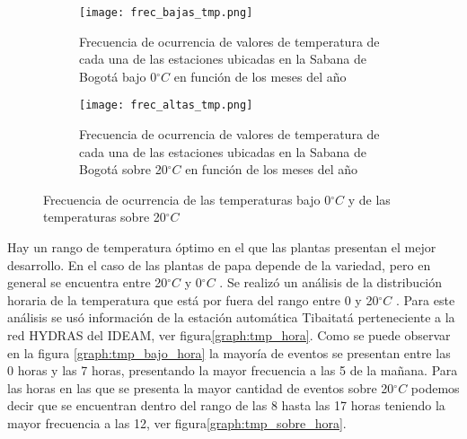 \documentclass[11pt]{article}
\def\celc{$^{\circ}C$ }%
\begin{document}
\begin{figure}[H]
	\begin{subfigure}[b]{\linewidth}
	\begin{center}
	\texttt{[image: frec\_bajas\_tmp.png]}
		
		\caption{Frecuencia de ocurrencia de valores de temperatura de cada una de las estaciones ubicadas en la Sabana de Bogotá bajo 0\celc en función de los meses del año}
		\label{graph:tmp_bajo_meses}
		
	\end{center}
	\end{subfigure}
	
	\begin{subfigure}[b]{\linewidth}
	\begin{center}
	\texttt{[image: frec\_altas\_tmp.png]}
		
		\caption{Frecuencia de ocurrencia de valores de temperatura de cada una de las estaciones ubicadas en la Sabana de Bogotá sobre 20\celc en función de los meses del año}		
		\label{graph:tmp_sobre_meses}
		
	\end{center}
	\end{subfigure}
	
	
	\caption{Frecuencia de ocurrencia de las temperaturas bajo 0\celc y de las temperaturas sobre 20\celc}		
	\label{graph:tmp_meses}

\end{figure}

Hay un rango de temperatura óptimo en el que las plantas presentan el mejor desarrollo. En el caso de las plantas de papa depende de la variedad, pero en general se encuentra entre 20\celc y 0\celc \citep{Hijmans2003}. Se realizó un análisis de la distribución horaria de la temperatura que está por fuera del rango entre 0 y 20\celc. Para este análisis se usó información de la estación automática Tibaitatá perteneciente a la red HYDRAS del IDEAM, ver figura\ref{graph:tmp_hora}. Como se puede observar en la figura \ref{graph:tmp_bajo_hora} la mayoría de eventos se presentan entre las 0 horas y las 7 horas, presentando la mayor frecuencia a las 5 de la mañana. Para las horas en las que se presenta la mayor cantidad de eventos sobre 20\celc podemos decir que se encuentran dentro del rango de las 8 hasta las 17 horas teniendo la mayor frecuencia a las 12, ver figura\ref{graph:tmp_sobre_hora}.
\end{document}
